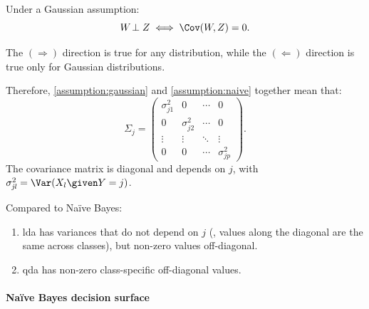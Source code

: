 \begin{proposition*}
    Under a Gaussian assumption:
    \begin{equation}
        W\negthinspace \perp Z \iff \Cov(W\negthinspace, Z) = 0.
    \end{equation}
\end{proposition*}

\begin{note}
    The $(\Rightarrow)$ direction is true for any distribution, while the $(\Leftarrow)$ direction is true only for Gaussian distributions.
\end{note}

Therefore, \eqref{assumption:gaussian} and \eqref{assumption:naive} together mean that:
\begin{equation}
    \Sigma_j = \begin{pmatrix}
        \sigma_{j1}^2 & 0             & \cdots & 0             \\
        0             & \sigma_{j2}^2 & \cdots & 0             \\[-1pt]
        \vdots        & \vdots        & \ddots & \vdots        \\[2pt]
        0             & 0             & \cdots & \sigma_{\mathit{jp}}^2
    \end{pmatrix}.
\end{equation}
The covariance matrix is diagonal and depends on $j$, with $\sigma_{\mathit{jl}}^2 = \Var(X_l \given Y = j)$.

Compared to Na\"ive Bayes:
\begin{enumerate}[beginpenalty=10000]
    \item \acs{lda} has variances that do not depend on $j$ (\ie, values along the diagonal are the same across classes), but non-zero values off-diagonal.
    \item \acs{qda} has non-zero class-specific off-diagonal values.
\end{enumerate}

\paragraph{Na\"ive Bayes decision surface}

